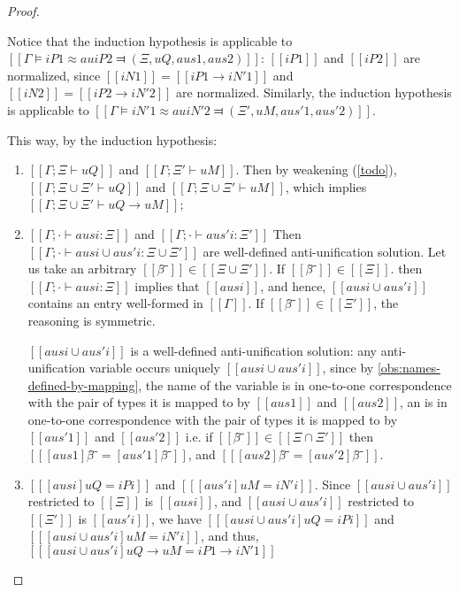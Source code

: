 \begin{proof}
\begin{caseof}
                Notice that the induction hypothesis is applicable to 
                $[[Γ ⊨ iP1 ≈au iP2 ⫤ (Ξ, uQ, aus1, aus2)]]$:
                $[[iP1]]$ and $[[iP2]]$ are normalized, since $[[iN1]] = [[iP1 → iN'1]]$
                and $[[iN2]] = [[iP2 → iN'2]]$ are normalized.
                Similarly, the induction hypothesis is applicable to
                $[[Γ ⊨ iN'1 ≈au iN'2 ⫤ (Ξ', uM, aus'1, aus'2)]]$.

                This way, by the induction hypothesis:
                \begin{enumerate}
                    \item $[[Γ ; Ξ ⊢ uQ]]$ and $[[Γ ; Ξ' ⊢ uM]]$. 
                    Then by weakening (\cref{todo}), $[[Γ ; Ξ ∪ Ξ' ⊢ uQ]]$ and 
                    $[[Γ ; Ξ ∪ Ξ' ⊢ uM]]$, which implies $[[Γ ; Ξ ∪ Ξ' ⊢ uQ → uM]]$;

                    \item $[[Γ ; · ⊢ ausi : Ξ]]$ and $[[Γ ; · ⊢ aus'i : Ξ']]$
                        Then $[[Γ ; · ⊢ ausi ∪ aus'i : Ξ ∪ Ξ']]$
                        are well-defined anti-unification solution.
                        Let us take an arbitrary $[[β̂⁻]] \in [[Ξ ∪ Ξ']]$.
                        If $[[β̂⁻]] \in [[Ξ]]$.
                        then $[[Γ ; · ⊢ ausi : Ξ]]$ implies that $[[ausi]]$, and hence,
                        $[[ausi ∪ aus'i]]$ contains an entry well-formed in $[[Γ]]$.
                        If $[[β̂⁻]] \in [[Ξ']]$, the reasoning is symmetric.

                        $[[ausi ∪ aus'i]]$ is a well-defined anti-unification solution:
                        any anti-unification variable occurs 
                        uniquely $[[ausi ∪ aus'i]]$, since by \cref{obs:names-defined-by-mapping},
                        the name of the variable is in one-to-one correspondence with 
                        the pair of types it is mapped to
                        by $[[aus1]]$ and $[[aus2]]$, 
                        an is in one-to-one correspondence with the pair of types it is mapped to
                        by $[[aus'1]]$ and $[[aus'2]]$ 
                        i.e.  if $[[β̂⁻]] \in [[Ξ ∩ Ξ']]$ then $[[ [aus1]β̂⁻ = [aus'1]β̂⁻ ]]$,
                        and $[[ [aus2]β̂⁻ = [aus'2]β̂⁻ ]]$.

                    \item $[[ [ausi] uQ = iPi ]]$ and $[[ [aus'i] uM = iN'i ]]$.
                    Since $[[ausi ∪ aus'i]]$ restricted to $[[Ξ]]$ is $[[ausi]]$,
                    and $[[ausi ∪ aus'i]]$ restricted to $[[Ξ']]$ is $[[aus'i]]$,
                    we have $[[ [ausi ∪ aus'i] uQ = iPi ]]$ and 
                    $[[ [ausi ∪ aus'i] uM = iN'i ]]$, and thus, 
                    $[[ [ausi ∪ aus'i] uQ → uM = iP1 → iN'1 ]]$
                \end{enumerate}


\end{caseof}
\end{proof}
